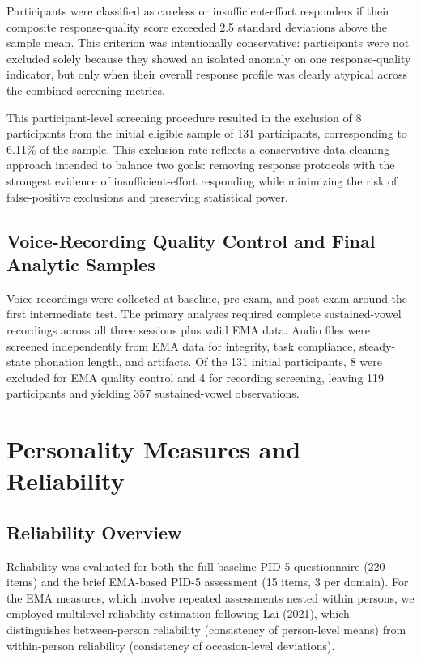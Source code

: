\documentclass[
  english,
  man,floatsintext]{apa6}
\begin{document}
Participants were classified as careless or insufficient-effort responders if their composite response-quality score exceeded 2.5 standard deviations above the sample mean. This criterion was intentionally conservative: participants were not excluded solely because they showed an isolated anomaly on one response-quality indicator, but only when their overall response profile was clearly atypical across the combined screening metrics.

This participant-level screening procedure resulted in the exclusion of 8 participants from the initial eligible sample of 131 participants, corresponding to 6.11\% of the sample. This exclusion rate reflects a conservative data-cleaning approach intended to balance two goals: removing response protocols with the strongest evidence of insufficient-effort responding while minimizing the risk of false-positive exclusions and preserving statistical power.

\subsection{Voice-Recording Quality Control and Final Analytic Samples}\label{s-voice-qc}

Voice recordings were collected at baseline, pre-exam, and post-exam around the first intermediate test. The primary analyses required complete sustained-vowel recordings across all three sessions plus valid EMA data. Audio files were screened independently from EMA data for integrity, task compliance, steady-state phonation length, and artifacts. Of the 131 initial participants, 8 were excluded for EMA quality control and 4 for recording screening, leaving 119 participants and yielding 357 sustained-vowel observations.

\newpage

\section{Personality Measures and Reliability}\label{personality-measures-and-reliability}

\subsection{Reliability Overview}\label{reliability-overview}

Reliability was evaluated for both the full baseline PID-5 questionnaire (220 items) and the brief EMA-based PID-5 assessment (15 items, 3 per domain). For the EMA measures, which involve repeated assessments nested within persons, we employed multilevel reliability estimation following Lai (2021), which distinguishes between-person reliability (consistency of person-level means) from within-person reliability (consistency of occasion-level deviations).
\end{document}
